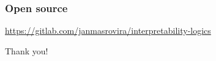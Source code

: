 \documentclass{beamer}
\begin{document}
\begin{frame}
  \frametitle{Open source}
  \centering
  \url{https://gitlab.com/janmasrovira/interpretability-logics}
\end{frame}

\begin{frame}
  \centering \Huge Thank you!
\end{frame}

\begin{frame}[allowframebreaks]
  \nocite{MasRovira:2020:MastersThesis}
  \nocite{joosten2020overview}
  \printbibliography
\end{frame}
\end{document}
